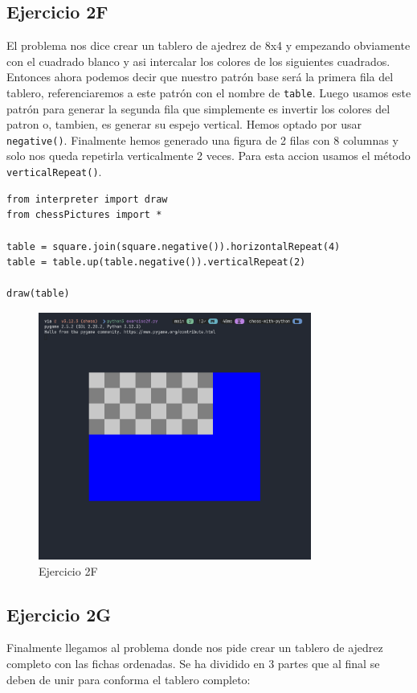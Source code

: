 \documentclass[10pt, a4paper]{article}
\newcommand{\mintpython}[1]{\texttt{#1}}
\begin{document}
\subsection{Ejercicio 2F}
El problema nos dice crear un tablero de ajedrez de 8x4 y empezando obviamente con el cuadrado blanco y asi intercalar los colores de los siguientes cuadrados. Entonces ahora podemos decir que nuestro patrón base será la primera fila del tablero, referenciaremos a este patrón con el nombre de \mintpython{table}. 
\singlespacing
Luego usamos este patrón para generar la segunda fila que simplemente es invertir los colores del patron o, tambien, es generar su espejo vertical. Hemos optado por usar \mintpython{negative()}.
\singlespacing
Finalmente hemos generado una figura de 2 filas con 8 columnas y solo nos queda repetirla verticalmente 2 veces. Para esta accion usamos el método \mintpython{verticalRepeat()}.

\begin{verbatim}
from interpreter import draw
from chessPictures import *

table = square.join(square.negative()).horizontalRepeat(4)
table = table.up(table.negative()).verticalRepeat(2)

draw(table)
\end{verbatim}

\begin{figure}[H]
  \centering
  \includegraphics[width=0.8\textwidth]{img/exercise2f.png}
  \caption{Ejercicio 2F}
\end{figure}

\subsection{Ejercicio 2G}
Finalmente llegamos al problema donde nos pide crear un tablero de ajedrez completo con las fichas ordenadas. Se ha dividido en 3 partes que al final se deben de unir para conforma el tablero completo:
\end{document}
